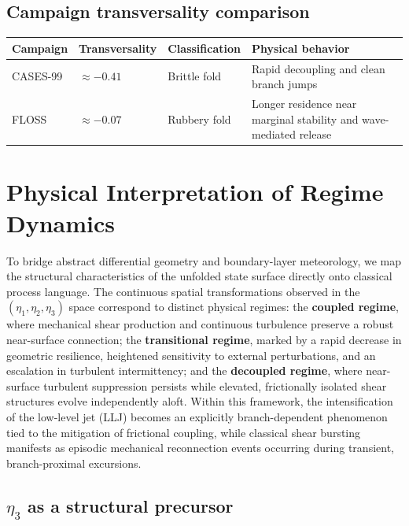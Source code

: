 \documentclass[12pt,a4paper]{article}
\begin{document}
\subsection{Campaign transversality comparison}

\begin{table}[h]
\centering
\small
\begin{tabular}{@{}llll@{}}
\toprule
\textbf{Campaign} & \textbf{Transversality} & \textbf{Classification} & \textbf{Physical behavior} \\
\midrule
CASES-99 & $\approx -0.41$ & Brittle fold & Rapid decoupling and clean branch jumps \\
FLOSS & $\approx -0.07$ & Rubbery fold & Longer residence near marginal stability and wave-mediated release \\
\bottomrule
\end{tabular}
\end{table}

\section{Physical Interpretation of Regime Dynamics}

To bridge abstract differential geometry and boundary-layer meteorology, we map the structural characteristics of the unfolded state surface directly onto classical process language. The continuous spatial transformations observed in the $(\eta_1, \eta_2, \eta_3)$ space correspond to distinct physical regimes: the \textbf{coupled regime}, where mechanical shear production and continuous turbulence preserve a robust near-surface connection; the \textbf{transitional regime}, marked by a rapid decrease in geometric resilience, heightened sensitivity to external perturbations, and an escalation in turbulent intermittency; and the \textbf{decoupled regime}, where near-surface turbulent suppression persists while elevated, frictionally isolated shear structures evolve independently aloft. Within this framework, the intensification of the low-level jet (LLJ) becomes an explicitly branch-dependent phenomenon tied to the mitigation of frictional coupling, while classical shear bursting manifests as episodic mechanical reconnection events occurring during transient, branch-proximal excursions.

\subsection{$\eta_3$ as a structural precursor}
\end{document}
